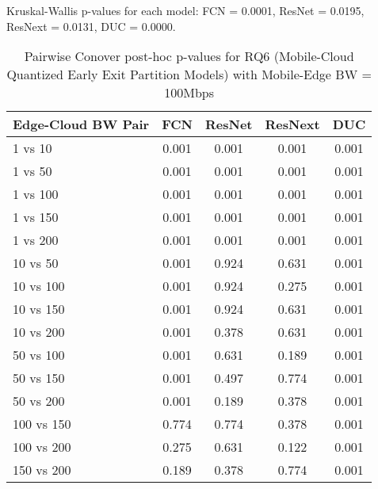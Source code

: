 \begin{table}[h]
\centering
\caption{Pairwise Conover post-hoc p-values for RQ6 (Mobile-Cloud Quantized Early Exit Partition Models) with Mobile-Edge BW = 100Mbps}
\label{tab:conover_mobile_cloud_quantized_earlyexit_partition_me100}
\smallskip
Kruskal-Wallis p-values for each model: FCN = 0.0001, ResNet = 0.0195, ResNext = 0.0131, DUC = 0.0000.

\begin{tabular}{lcccc}
\toprule
Edge-Cloud BW Pair & FCN & ResNet & ResNext & DUC \\
\midrule
1 vs 10 & 0.001 & 0.001 & 0.001 & 0.001 \\
1 vs 50 & 0.001 & 0.001 & 0.001 & 0.001 \\
1 vs 100 & 0.001 & 0.001 & 0.001 & 0.001 \\
1 vs 150 & 0.001 & 0.001 & 0.001 & 0.001 \\
1 vs 200 & 0.001 & 0.001 & 0.001 & 0.001 \\
10 vs 50 & 0.001 & 0.924 & 0.631 & 0.001 \\
10 vs 100 & 0.001 & 0.924 & 0.275 & 0.001 \\
10 vs 150 & 0.001 & 0.924 & 0.631 & 0.001 \\
10 vs 200 & 0.001 & 0.378 & 0.631 & 0.001 \\
50 vs 100 & 0.001 & 0.631 & 0.189 & 0.001 \\
50 vs 150 & 0.001 & 0.497 & 0.774 & 0.001 \\
50 vs 200 & 0.001 & 0.189 & 0.378 & 0.001 \\
100 vs 150 & 0.774 & 0.774 & 0.378 & 0.001 \\
100 vs 200 & 0.275 & 0.631 & 0.122 & 0.001 \\
150 vs 200 & 0.189 & 0.378 & 0.774 & 0.001 \\
\bottomrule
\end{tabular}
\end{table}

